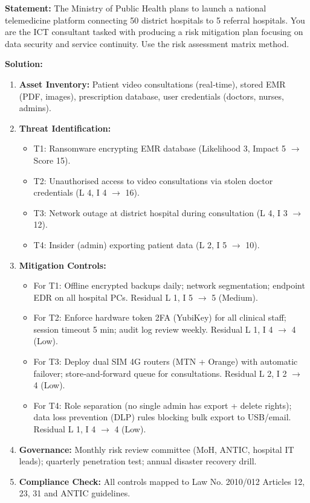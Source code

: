\documentclass[11pt]{article}
\begin{document}
\begin{exoresolu}
\textbf{Statement:} The Ministry of Public Health plans to launch a national telemedicine platform connecting 50 district hospitals to 5 referral hospitals. You are the ICT consultant tasked with producing a risk mitigation plan focusing on data security and service continuity. Use the risk assessment matrix method.

\textbf{Solution:}
\begin{enumerate}
\item \textbf{Asset Inventory:} Patient video consultations (real‑time), stored EMR (PDF, images), prescription database, user credentials (doctors, nurses, admins).
\item \textbf{Threat Identification:}
\begin{itemize}
\item T1: Ransomware encrypting EMR database (Likelihood 3, Impact 5 $\rightarrow$ Score 15).
\item T2: Unauthorised access to video consultations via stolen doctor credentials (L 4, I 4 $\rightarrow$ 16).
\item T3: Network outage at district hospital during consultation (L 4, I 3 $\rightarrow$ 12).
\item T4: Insider (admin) exporting patient data (L 2, I 5 $\rightarrow$ 10).
\end{itemize}
\item \textbf{Mitigation Controls:}
\begin{itemize}
\item For T1: Offline encrypted backups daily; network segmentation; endpoint EDR on all hospital PCs. Residual L 1, I 5 $\rightarrow$ 5 (Medium).
\item For T2: Enforce hardware token 2FA (YubiKey) for all clinical staff; session timeout 5 min; audit log review weekly. Residual L 1, I 4 $\rightarrow$ 4 (Low).
\item For T3: Deploy dual SIM 4G routers (MTN + Orange) with automatic failover; store‑and‑forward queue for consultations. Residual L 2, I 2 $\rightarrow$ 4 (Low).
\item For T4: Role separation (no single admin has export + delete rights); data loss prevention (DLP) rules blocking bulk export to USB/email. Residual L 1, I 4 $\rightarrow$ 4 (Low).
\end{itemize}
\item \textbf{Governance:} Monthly risk review committee (MoH, ANTIC, hospital IT leads); quarterly penetration test; annual disaster recovery drill.
\item \textbf{Compliance Check:} All controls mapped to Law No. 2010/012 Articles 12, 23, 31 and ANTIC guidelines.
\end{enumerate}
\end{exoresolu}
\end{document}

